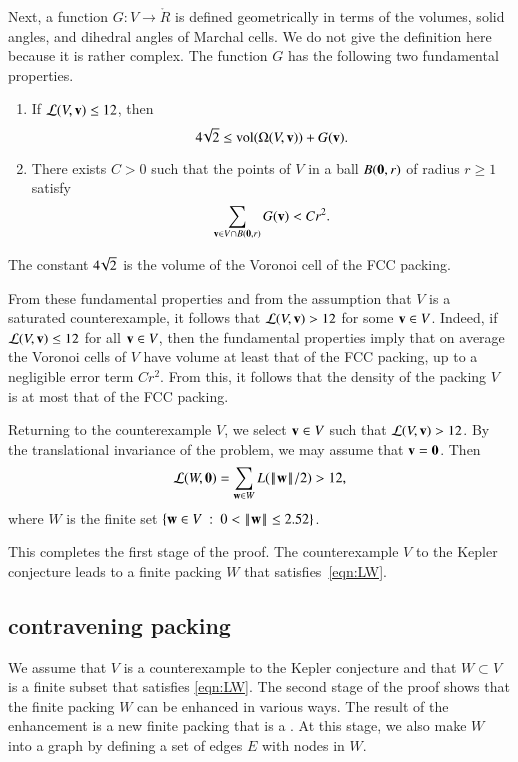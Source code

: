 Next, a function $G:V\to \ring{R}$ is defined geometrically in terms
of the volumes, solid angles, and dihedral angles of Marchal cells.
We do not give the definition here because it is rather
complex.  The function $G$ has the following two fundamental
properties.
\begin{enumerate}
\item If ${\mathcal L}(V,{\mathbf v})\le 12$, then 
\[
4\!\sqrt{2}\le {\operatorname{vol}}(\Omega(V,{\mathbf v})) +G({\mathbf v}).
\]
\item There exists $C>0$ such that the points of $V$ in a ball $B({\mathbf 0},r)$
of radius $r\ge 1$ satisfy
\[
\sum_{{\mathbf v}\in V \cap B({\mathbf 0},r)} G({\mathbf v}) < C r^2.
\]
\end{enumerate}
The constant $4\!\sqrt{2}$ is the volume of the Voronoi cell of the FCC packing.

From these fundamental properties and from the assumption that $V$ is a saturated counterexample,
it follows that ${\mathcal L}(V,{\mathbf v})>12$ for some ${\mathbf v}\in V$.  Indeed, if ${\mathcal L}(V,{\mathbf v})\le 12$ for all
${\mathbf v}\in V$, then the fundamental properties
imply that on average the Voronoi cells of $V$ have volume at least that of the FCC packing, up to a negligible error term $C r^2$.  From this, it follows that the density
of the packing $V$ is at most that of the FCC packing.



Returning to the counterexample $V$, we select ${\mathbf v}\in V$ such that
${\mathcal L}(V,{\mathbf v})>12$.  By the translational invariance of the problem, we
may assume that ${\mathbf v}={\mathbf 0}$.  Then
\begin{equation}\label{eqn:LW}
{\mathcal L}(W,{\mathbf 0}) = \sum_{{\mathbf w}\in W} L({\hbox{\ensuremath{\hspace{0.1em}|\hspace{-0.1em}|\hspace{0.1em}}}{\mathbf w}\hbox{\ensuremath{\hspace{0.1em}|\hspace{-0.1em}|\hspace{0.1em}}}}/2)  > 12,
\end{equation}
where $W$ is the finite set  $\{{\mathbf w}\in V\ :\  0 < {\hbox{\ensuremath{\hspace{0.1em}|\hspace{-0.1em}|\hspace{0.1em}}}{\mathbf w}\hbox{\ensuremath{\hspace{0.1em}|\hspace{-0.1em}|\hspace{0.1em}}}} \le 2.52\}$.

This completes the first stage of the proof.
The counterexample $V$ to the Kepler conjecture leads to a finite packing $W$
that satisfies~\eqref{eqn:LW}.

\subsection{contravening packing}

We assume that $V$ is a counterexample to the Kepler conjecture and
that $W\subset V$ is a finite subset that satisfies \eqref{eqn:LW}.
The second stage of the proof shows that the finite packing $W$ can be
enhanced in various ways.  The result of the enhancement is a new
finite packing that is a .  At this stage, we also make $W$ into a
graph by defining a set of edges $E$ with nodes in $W$.

